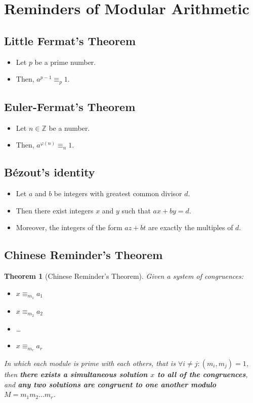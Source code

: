 \documentclass[12pt, a4paper, english]{report}
\newtheorem{theorem}{Theorem}
\begin{document}
\section{Reminders of Modular Arithmetic}
\subsection{Little Fermat's Theorem}\label{little_fermat_th}
\begin{itemize}
    \item Let $p$ be a prime number.
    \item Then, $a^{p-1} \equiv_{p} 1$.
\end{itemize}

\subsection{Euler-Fermat's Theorem}\label{euler_fermat_th}
\begin{itemize}
    \item Let $n \in \mathbb{Z}$ be a number.
    \item Then, $a^{\varphi(n)} \equiv_{n} 1$.
\end{itemize}

\subsection{Bézout's identity}
 \begin{itemize}
     \item Let $a$ and $b$ be integers with greatest common divisor $d$.
     \item Then there exist integers $x$ and $y$ such that $ax + by = d$.
     \item Moreover, the integers of the form $az + bt$ are exactly the multiples of $d$.
 \end{itemize}

\subsection{Chinese Reminder's Theorem}
\begin{theorem}[Chinese Reminder's Theorem]
    Given a system of congruences:
    \begin{itemize}
        \item $x \equiv_{m_{1}} a_{1}$
        \item $x \equiv_{m_{2}} a_{2}$
        \item \dots
        \item $x \equiv_{m_{r}} a_{r}$
    \end{itemize}
    In which each module is prime with each others, that is $\forall i \neq j: (m_{i}, m_{j}) = 1$,
    then \textbf{there exists a simultaneous solution $x$ to all of the congruences}, and \textbf{any two solutions are congruent to one another modulo $M = m_{1}m_{2}\dots m_{r}$}.
\end{theorem}
\end{document}
